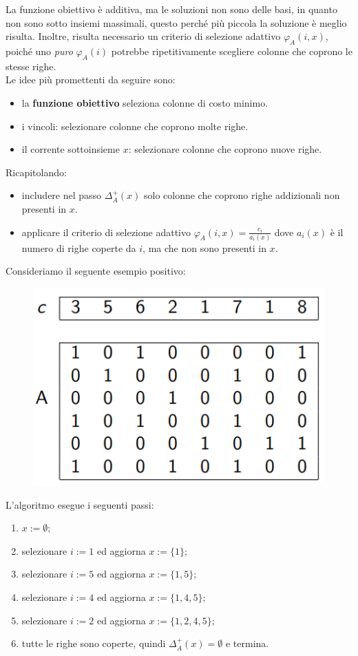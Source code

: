 \documentclass{article}
\begin{document}
La funzione obiettivo è additiva, ma le soluzioni non sono delle basi, in quanto non sono sotto insiemi massimali,
questo perché più piccola la soluzione è meglio risulta. Inoltre, risulta necessario un criterio di selezione
adattivo $\varphi_A(i,x)$, poiché uno \textit{puro} $\varphi_A(i)$ potrebbe ripetitivamente scegliere colonne che
coprono le stesse righe.\\Le idee più promettenti da seguire sono:
\begin{itemize}
    \item la \textbf{funzione obiettivo} seleziona colonne di costo minimo.
    \item i vincoli: selezionare colonne che coprono molte righe.
    \item il corrente sottoinsieme $x$: selezionare colonne che coprono nuove righe.
\end{itemize}
Ricapitolando:
\begin{itemize}
    \item includere nel passo $\Delta_A^+(x)$ solo colonne che coprono righe addizionali non presenti in $x$.
    \item applicare il criterio di selezione adattivo $\varphi_A(i,x)=\frac{c_i}{a_i(x)}$ dove
          $a_i(x)$ è il numero di righe coperte da $i$, ma che non sono presenti in $x$.
\end{itemize}
Consideriamo il seguente esempio positivo:
\begin{figure}[H]
    \centering
    \includegraphics[scale=0.5]{images/set_cover.png}
\end{figure}
L'algoritmo esegue i seguenti passi:
\begin{enumerate}
    \item $x:=\emptyset;$
    \item selezionare $i:=1$ ed aggiorna $x:=\{1\};$
    \item selezionare $i:=5$ ed aggiorna $x:=\{1,5\};$
    \item selezionare $i:=4$ ed aggiorna $x:=\{1,4,5\};$
    \item selezionare $i:=2$ ed aggiorna $x:=\{1,2,4,5\};$
    \item tutte le righe sono coperte, quindi $\Delta_A^+(x)=\emptyset$ e termina.
\end{enumerate}
\end{document}
